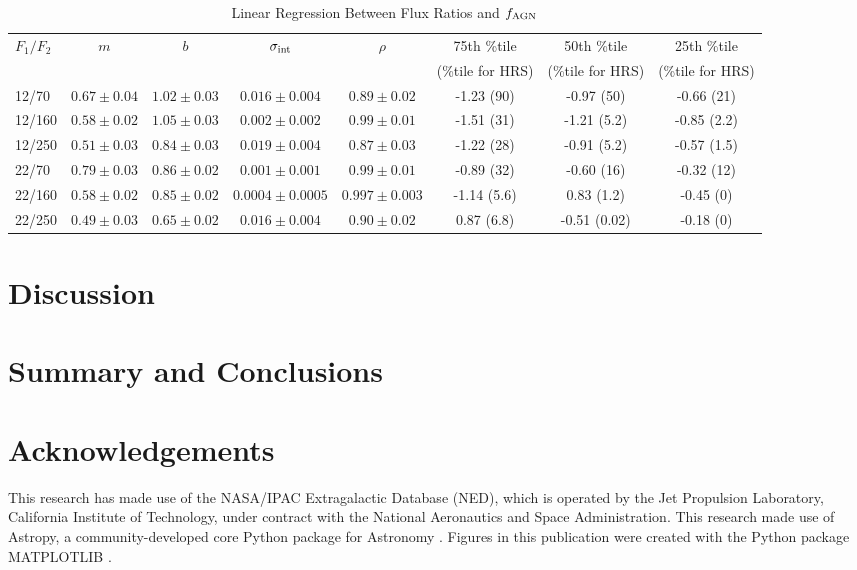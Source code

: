 \documentclass[fleqn, usenatbib]{mnras}
\begin{document}
\begin{table*}
\begin{threeparttable}
\captionsetup{font=small,labelfont=bf,labelsep=period}
\caption{Linear Regression Between Flux Ratios and $f_{\rm AGN}$\label{tab:flux_ratio_fagn_linreg}}
\begin{tabular}{lccccccc}
\toprule 
$F_{1}/F_{2}$ & $m$ & $b$  & $\sigma_{\rm int}$ & $\rho$ & 75th \%tile  & 50th \%tile  & 25th \%tile\\
&&&&&(\%tile for HRS)&(\%tile for HRS)&(\%tile for HRS)\\
\midrule
12/70      & $0.67\pm0.04$ & $1.02\pm0.03$ & $0.016\pm0.004$ & $0.89\pm0.02$ & -1.23 (90) & -0.97 (50) & -0.66 (21)\\
12/160    & $0.58\pm0.02$ & $1.05\pm0.03$ & $0.002\pm0.002$ & $0.99\pm0.01$ & -1.51 (31) & -1.21 (5.2) & -0.85 (2.2)\\
12/250    & $0.51\pm0.03$ & $0.84\pm0.03$ & $0.019\pm0.004$ & $0.87\pm0.03$ & -1.22 (28) &  -0.91 (5.2) & -0.57 (1.5)\\
22/70      & $0.79\pm0.03$ & $0.86\pm0.02$ & $0.001\pm0.001$ & $0.99\pm0.01$ & -0.89 (32) & -0.60 (16) & -0.32 (12)\\
22/160    & $0.58\pm0.02$ & $0.85\pm0.02$ & $0.0004\pm0.0005$ & $0.997\pm0.003$ & -1.14 (5.6) & 0.83 (1.2) & -0.45 (0)\\
22/250    & $0.49\pm0.03$ & $0.65\pm0.02$ & $0.016\pm0.004$ & $0.90\pm0.02$ & 0.87 (6.8) & -0.51 (0.02) & -0.18 (0) \\
\bottomrule
\end{tabular}
\end{threeparttable}
\end{table*}
\section{Discussion}

\section{Summary and Conclusions}

\section*{Acknowledgements}
This research has made use of the NASA/IPAC Extragalactic Database (NED), which is operated by the Jet Propulsion Laboratory, California Institute of Technology, under contract with the National Aeronautics and Space Administration. This research made use of Astropy, a community-developed core Python package for Astronomy \citep{Astropy:2013ek}. Figures in this publication were created with the Python package \textsc{MATPLOTLIB} \citep{Hunter:2007}. 
\end{document}
